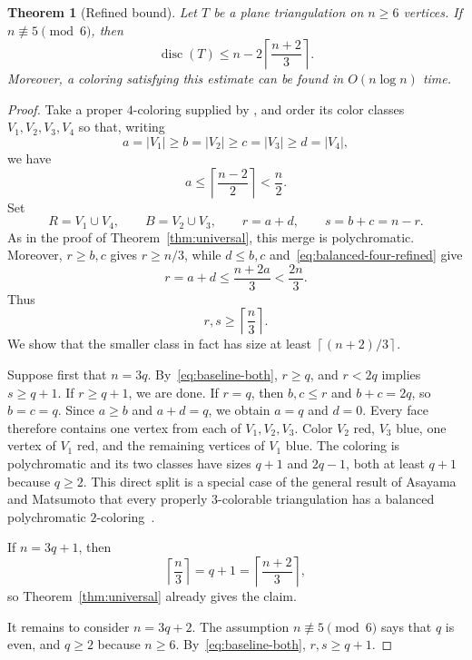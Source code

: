 \documentclass[10pt,a4paper]{amsart}
\newtheorem{theorem}{Theorem}
\newcommand{\ceil}[1]{\left\lceil #1\right\rceil}
\newcommand{\disc}{\operatorname{disc}}
\begin{document}
\begin{theorem}[Refined bound]\label{thm:refined}
Let $T$ be a plane triangulation on $n\ge6$ vertices.  If
$n\not\equiv5\pmod6$, then
\begin{equation}\label{eq:refined}
  \disc(T)\le n-2\ceil{\frac{n+2}{3}}.
\end{equation}
Moreover, a coloring satisfying this estimate can be found in $O(n\log n)$ time.
\end{theorem}

\begin{proof}
Take a proper $4$-coloring supplied by
\cite[Corollary~17]{KawarabayashiEtAl2026}, and order its color classes
$V_1,V_2,V_3,V_4$ so that, writing
\[
  a=|V_1|\ge b=|V_2|\ge c=|V_3|\ge d=|V_4|,
\]
we have
\begin{equation}\label{eq:balanced-four-refined}
  a\le\ceil{\frac{n-2}{2}}<\frac n2.
\end{equation}
Set
\[
  R=V_1\cup V_4,
  \qquad
  B=V_2\cup V_3,
  \qquad
  r=a+d,
  \qquad
  s=b+c=n-r.
\]
As in the proof of Theorem~\ref{thm:universal}, this merge is
polychromatic.  Moreover, $r\ge b,c$ gives $r\ge n/3$, while
$d\le b,c$ and~\eqref{eq:balanced-four-refined} give
\[
  r=a+d\le\frac{n+2a}{3}<\frac{2n}{3}.
\]
Thus
\begin{equation}\label{eq:baseline-both}
  r,s\ge\ceil{\frac n3}.
\end{equation}
We show that the smaller class in fact has size at least
$\ceil{(n+2)/3}$.

Suppose first that $n=3q$.  By~\eqref{eq:baseline-both}, $r\ge q$,
and $r<2q$ implies $s\ge q+1$.  If $r\ge q+1$, we are done.  If
$r=q$, then $b,c\le r$ and $b+c=2q$, so $b=c=q$.  Since $a\ge b$
and $a+d=q$, we obtain $a=q$ and $d=0$.  Every face therefore contains
one vertex from each of $V_1,V_2,V_3$.  Color $V_2$ red, $V_3$ blue,
one vertex of $V_1$ red, and the remaining vertices of $V_1$ blue.  The
coloring is polychromatic and its two classes have sizes $q+1$ and
$2q-1$, both at least $q+1$ because $q\ge2$.  This direct split is a special case of the general result of Asayama and
Matsumoto that every properly $3$-colorable triangulation has a balanced
polychromatic $2$-coloring~\cite{AsayamaMatsumoto2022}.

If $n=3q+1$, then
\[
  \ceil{\frac n3}=q+1=\ceil{\frac{n+2}{3}},
\]
so Theorem~\ref{thm:universal} already gives the claim.

It remains to consider $n=3q+2$.  The assumption
$n\not\equiv5\pmod6$ says that $q$ is even, and $q\ge2$ because
$n\ge6$.  By~\eqref{eq:baseline-both}, $r,s\ge q+1$.


\end{proof}
\end{document}
